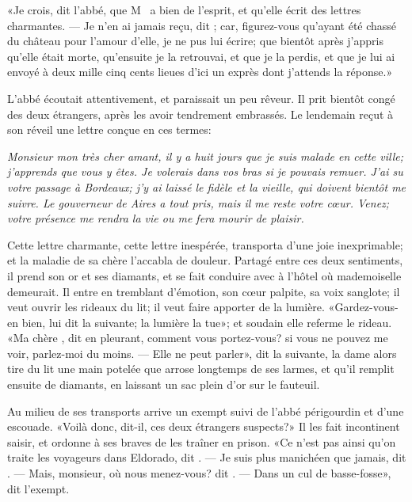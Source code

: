 «Je crois, dit l’abbé, que M~ a bien de l’esprit, et
qu’elle écrit des lettres charmantes. — Je n’en ai jamais reçu, dit
; car, figurez-vous qu’ayant été chassé du château pour l’amour
d’elle, je ne pus lui écrire; que bientôt après j’appris qu’elle était
morte, qu’ensuite je la retrouvai, et que je la perdis, et que je lui
ai envoyé à deux mille cinq cents lieues d’ici un exprès dont j’attends
la réponse.»

L’abbé écoutait attentivement, et paraissait un peu rêveur. Il prit
bientôt congé des deux étrangers, après les avoir tendrement embrassés.
Le lendemain  reçut à son réveil une lettre conçue en ces
termes:
\par\vspace{\baselineskip}\par
{\itshape Monsieur mon très cher amant, il y a huit jours que je suis malade en
cette ville; j’apprends que vous y êtes. Je volerais dans vos bras si
je pouvais remuer. J’ai su votre passage à Bordeaux; j’y ai laissé le
fidèle  et la vieille, qui doivent bientôt me suivre. Le
gouverneur de  Aires a tout pris, mais il me reste votre cœur.
Venez; votre présence me rendra la vie ou me fera mourir de plaisir.

}
\par\vspace{\baselineskip}\par
Cette lettre charmante, cette lettre inespérée, transporta 
d’une joie inexprimable; et la maladie de sa chère  l’accabla
de douleur. Partagé entre ces deux sentiments, il prend son or et ses
diamants, et se fait conduire avec  à l’hôtel où 
mademoiselle
 demeurait. Il entre en tremblant d’émotion, son cœur
palpite, sa voix sanglote; il veut ouvrir les rideaux du lit; il veut
faire apporter de la lumière. «Gardez-vous-en bien, lui dit la suivante;
la lumière la tue»; et soudain elle referme le rideau. «Ma chère
, dit  en pleurant, comment vous portez-vous? si vous
ne pouvez me voir, parlez-moi du moins. — Elle ne peut parler», dit la
suivante, la dame alors tire du lit une main potelée que  arrose
longtemps de ses larmes, et qu’il remplit ensuite de diamants, en
laissant un sac plein d’or sur le fauteuil.


Au milieu de ses transports arrive un exempt suivi de l’abbé
périgourdin et d’une escouade. «Voilà donc, dit-il, ces deux étrangers
suspects?» Il les fait incontinent saisir, et ordonne à ses braves de
les traîner en prison. «Ce n’est pas ainsi qu’on traite les voyageurs
dans Eldorado, dit . — Je suis plus manichéen que jamais, dit
. — Mais, monsieur, où nous menez-vous? dit . — Dans un cul de
basse-fosse», dit l’exempt.

